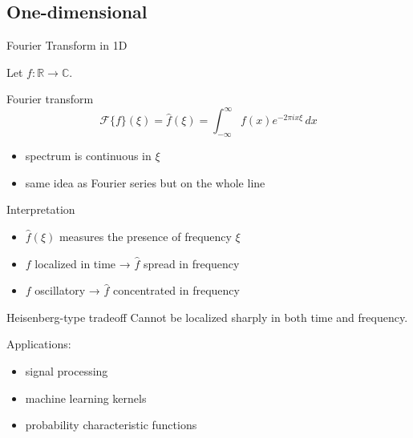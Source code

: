 \documentclass[aspectratio=169]{beamer}
\begin{document}
\subsection{One-dimensional}

\begin{frame}{Fourier Transform in 1D}

Let $f:\mathbb{R}\to\mathbb{C}$.

\begin{block}{Fourier transform}
\[
\mathcal{F}\{f\}(\xi)
=
\hat{f}(\xi)
=
\int_{-\infty}^{\infty}
f(x)e^{-2\pi i x \xi}\,dx
\]
\end{block}
\pause
\begin{itemize}
    \item spectrum is continuous in $\xi$
    \item same idea as Fourier series but on the whole line
\end{itemize}

\end{frame}

\begin{frame}{Interpretation}

\begin{itemize}
    \item $\hat{f}(\xi)$ measures the presence of frequency $\xi$
    \item $f$ localized in time → $\hat f$ spread in frequency
    \item $f$ oscillatory → $\hat f$ concentrated in frequency
\end{itemize}

\begin{block}{Heisenberg-type tradeoff}
Cannot be localized sharply in both time and frequency.
\end{block}

Applications:
\begin{itemize}
    \item signal processing
    \item machine learning kernels
    \item probability characteristic functions
\end{itemize}

\end{frame}
\end{document}

